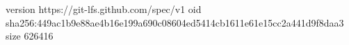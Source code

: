 version https://git-lfs.github.com/spec/v1
oid sha256:449ac1b9e88ae4b16e199a690c08604ed5414cb1611e61e15cc2a441d9f8daa3
size 626416
